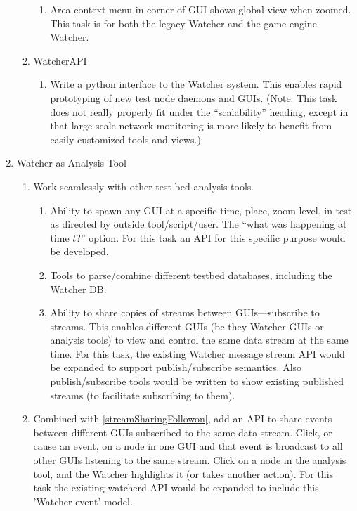 \documentclass{report}
\begin{document}
\begin{enumerate}
\begin{enumerate}
\begin{enumerate}
        \item Area context menu in corner of GUI shows global view when zoomed. This task is for both the legacy Watcher and the game engine Watcher. 
    \end{enumerate}
    \item WatcherAPI
    \begin{enumerate}
        \item Write a python interface to the Watcher system. This enables rapid prototyping of new test node daemons and GUIs. (Note: This task does not really properly fit under the ``scalability'' heading, except in that large-scale network monitoring is more likely to benefit from easily customized tools and views.)
    \end{enumerate}
\end{enumerate}
\item Watcher as Analysis Tool 
    \begin{enumerate}
    \item Work seamlessly with other test bed analysis tools.
        \begin{enumerate}
            \item Ability to spawn any GUI at a specific time, place, zoom level, in test as directed by outside tool\slash script\slash user. The ``what was happening at time $t$?'' option. For this task an API for this specific purpose would be developed.  
            \item Tools to parse\slash combine different testbed databases, including the Watcher DB.
            \item Ability to share copies of streams between GUIs---subscribe to streams. This enables different GUIs (be they Watcher GUIs or analysis tools) to view and control the same data stream at the same time. For this task, the existing Watcher message stream API would be expanded to support publish\slash subscribe semantics. Also publish\slash subscribe tools would be written to show existing published streams (to facilitate subscribing to them).
            \label{streamSharingFollowon}
        \end{enumerate}
        \item Combined with \ref{streamSharingFollowon}, add an API to share events between different GUIs subscribed to the same data stream. Click, or cause an event, on a node in one GUI and that event is broadcast to all other GUIs listening to the same stream. Click on a node in the analysis tool, and the Watcher highlights it (or takes another action). For this task the existing watcherd API would be expanded to include this 'Watcher event' model.

\end{enumerate}
\end{enumerate}
\end{document}
